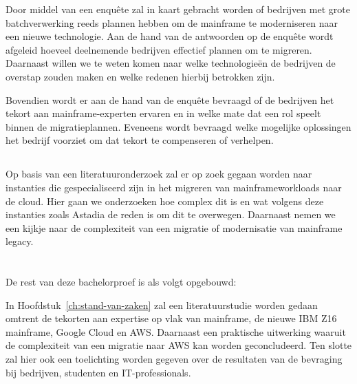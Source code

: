 Door middel van een enquête zal in kaart gebracht worden of bedrijven met grote batchverwerking reeds plannen hebben om de mainframe te moderniseren naar een nieuwe technologie. Aan de hand van de antwoorden op de enquête wordt afgeleid hoeveel deelnemende bedrijven effectief plannen om te migreren. Daarnaast willen we te weten komen naar welke technologieën de bedrijven de overstap zouden maken en welke redenen hierbij betrokken zijn. 

Bovendien wordt er aan de hand van de enquête bevraagd of de bedrijven het tekort aan mainframe-experten ervaren en in welke mate dat een rol speelt binnen de migratieplannen. Eveneens wordt bevraagd welke mogelijke oplossingen het bedrijf voorziet om dat tekort te compenseren of verhelpen. 

\subsection{}

Op basis van een literatuuronderzoek zal er op zoek gegaan worden naar instanties die gespecialiseerd zijn in het migreren van mainframeworkloads naar de cloud. Hier gaan we onderzoeken hoe complex dit is en wat volgens deze instanties zoals Astadia de reden is om dit te overwegen. Daarnaast nemen we een kijkje naar de complexiteit van een migratie of modernisatie van mainframe legacy.

\section{}
\label{sec:opzet-bachelorproef}


De rest van deze bachelorproef is als volgt opgebouwd:

In Hoofdstuk~\ref{ch:stand-van-zaken} zal een literatuurstudie worden gedaan omtrent de tekorten aan expertise op vlak van mainframe, de nieuwe IBM Z16 mainframe, Google Cloud en AWS. Daarnaast een praktische uitwerking waaruit de complexiteit van een migratie naar AWS kan worden geconcludeerd. Ten slotte zal hier ook een toelichting worden gegeven over de resultaten van de bevraging bij bedrijven, studenten en IT-professionals. 

